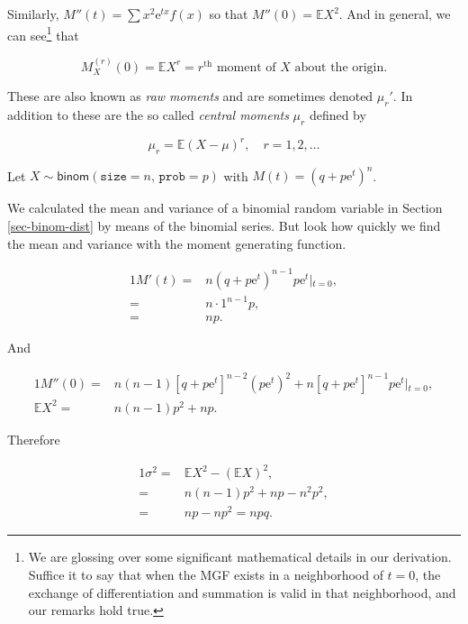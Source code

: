 \documentclass[]{book}
\let\rmarkdownfootnote\footnote%
\def\footnote{\protect\rmarkdownfootnote}
\numberwithin{equation}{chapter}
\numberwithin{figure}{chapter}
\theoremstyle{plain}
\theoremstyle{definition}
\theoremstyle{remark}
\theoremstyle{definition}
\theoremstyle{definition}
\theoremstyle{remark}
\let\BeginKnitrBlock\begin \let\EndKnitrBlock\end
\begin{document}
Similarly, \(M''(t) = \sum x^{2} \mathrm{e}^{tx} f(x)\) so that
\(M''(0) = \mathbb{E} X^{2}\). And in general, we can see\footnote{We
  are glossing over some significant mathematical details in our
  derivation. Suffice it to say that when the MGF exists in a
  neighborhood of \(t=0\), the exchange of differentiation and summation
  is valid in that neighborhood, and our remarks hold true.} that

\begin{equation}
M_{X}^{(r)}(0)=\mathbb{E} X^{r}=\mbox{\(r^{\mathrm{th}}\) moment of \(X\) about the origin.}
\end{equation}

These are also known as \emph{raw moments} and are sometimes denoted
\(\mu_{r}'\). In addition to these are the so called \emph{central
moments} \(\mu_{r}\) defined by

\begin{equation}
\mu_{r}=\mathbb{E}(X-\mu)^{r},\quad r=1,2,\ldots
\end{equation}

\bigskip

\BeginKnitrBlock{example}
\protect\hypertarget{ex:unnamed-chunk-218}{}{\label{ex:unnamed-chunk-218}}Let
\(X \sim \mathsf{binom}(\mathtt{size} = n,\,\mathtt{prob} = p)\) with
\(M(t) = (q + p \mathrm{e}^{t})^{n}\).
\EndKnitrBlock{example}

We calculated the mean and variance of a binomial random variable in
Section \ref{sec-binom-dist} by means of the binomial series. But look
how quickly we find the mean and variance with the moment generating
function.

\begin{alignat*}{1}
M'(t)= & n(q+p\mathrm{e}^{t})^{n-1}p\mathrm{e}^{t}\left|_{t=0}\right.,\\
= & n\cdot1^{n-1}p,\\
= & np.
\end{alignat*}

And

\begin{alignat*}{1}
M''(0)= & n(n-1)[q+p\mathrm{e}^{t}]^{n-2}(p\mathrm{e}^{t})^{2}+n[q+p\mathrm{e}^{t}]^{n-1}p\mathrm{e}^{t}\left|_{t=0}\right.,\\
\mathbb{E} X^{2}= & n(n-1)p^{2}+np.
\end{alignat*}

Therefore

\begin{alignat*}{1}
\sigma^{2}= & \mathbb{E} X^{2}-(\mathbb{E} X)^{2},\\
= & n(n-1)p^{2}+np-n^{2}p^{2},\\
= & np-np^{2}=npq.
\end{alignat*}
\end{document}
